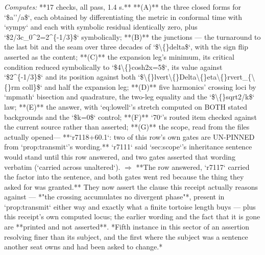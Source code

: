 \begin{description}
\emph{Computes:} **17 checks, all pass, 1.4 s.** **(A)** the three closed forms for `\$a''/a\$`, each obtained by differentiating the metric in conformal time with `sympy` and each with symbolic residual identically zero, plus `\$2/3c\_0\textasciicircum{}2=2\textasciicircum{}\{-1/3\}\$` symbolically; **(B)** the junctions --- the turnaround to the last bit and the seam over three decades of `\$\textbackslash\{\}delta\$`, with the sign flip asserted as the content; **(C)** the expansion leg's minimum, its critical condition reduced symbolically to `\$4\textbackslash\{\}cosh2x=5\$`, its value against `\$2\textasciicircum{}\{-1/3\}\$` and its position against both `\$\textbackslash\{\}lvert\textbackslash\{\}Delta\textbackslash\{\}eta\textbackslash\{\}rvert\_\{\textbackslash\{\}rm coll\}\$` and half the expansion leg; **(D)** five harmonics' crossing loci by `mpmath` bisection and quadrature, the two-leg equality and the `\$\textbackslash\{\}sqrt2/k\$` law; **(E)** the answer, with `eq:lowell`'s stretch computed on BOTH stated backgrounds and the `\$k=0\$` control; **(F)** `70`'s routed item checked against the current source rather than asserted; **(G)** the scope, read from the files actually opened---  **`r7118+60.1`: two of this row's own gates are UN-PINNED from `prop:transmit`'s wording.** `r7111` said `sec:scope`'s inheritance sentence would stand until this row answered, and two gates asserted that wording verbatim (`carried across unaltered`). \ensuremath{\Rightarrow} **The row answered, `r7117` carried the factor into the sentence, and both gates went red because the thing they asked for was granted.** They now assert the clause this receipt actually reasons against --- *"the crossing accumulates no divergent phase"*, present in `prop:transmit` either way and exactly what a finite tortoise length buys --- plus this receipt's own computed locus; the earlier wording and the fact that it is gone are **printed and not asserted**.  *Fifth instance in this sector of an assertion resolving finer than its subject, and the first where the subject was a sentence another seat owns and had been asked to change.*

\end{description}
